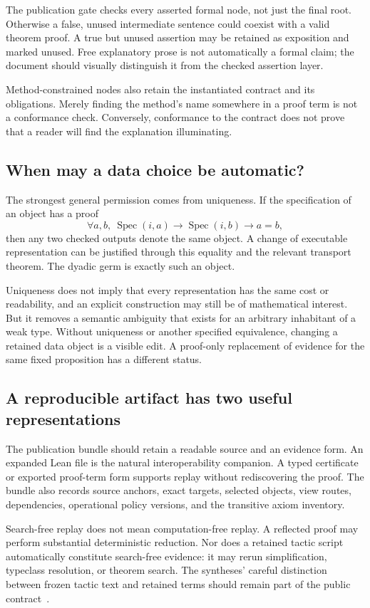 \documentclass[11pt,letterpaper]{article}
\newcommand{\Spec}{\operatorname{Spec}}
\theoremstyle{definition}
\theoremstyle{remark}
\begin{document}
The publication gate checks every asserted formal node, not just the final
root. Otherwise a false, unused intermediate sentence could coexist with a
valid theorem proof. A true but unused assertion may be retained as exposition
and marked unused. Free explanatory prose is not automatically a formal claim;
the document should visually distinguish it from the checked assertion layer.

Method-constrained nodes also retain the instantiated contract and its
obligations. Merely finding the method's name somewhere in a proof term is not
a conformance check. Conversely, conformance to the contract does not prove
that a reader will find the explanation illuminating.

\subsection{When may a data choice be automatic?}
The strongest general permission comes from uniqueness. If the specification
of an object has a proof
\[
 \forall a,b,\ \Spec(i,a)\to\Spec(i,b)\to a=b,
\]
then any two checked outputs denote the same object. A change of executable
representation can be justified through this equality and the relevant
transport theorem. The dyadic germ is exactly such an object.

Uniqueness does not imply that every representation has the same cost or
readability, and an explicit construction may still be of mathematical
interest. But it removes a semantic ambiguity that exists for an arbitrary
inhabitant of a weak type. Without uniqueness or another specified equivalence,
changing a retained data object is a visible edit. A proof-only replacement
of evidence for the same fixed proposition has a different status.

\subsection{A reproducible artifact has two useful representations}
The publication bundle should retain a readable source and an evidence form.
An expanded Lean file is the natural interoperability companion. A typed
certificate or exported proof-term form supports replay without rediscovering
the proof. The bundle also records source anchors, exact targets, selected
objects, view routes, dependencies, operational policy versions, and the
transitive axiom inventory.

Search-free replay does not mean computation-free replay. A reflected proof
may perform substantial deterministic reduction. Nor does a retained tactic
script automatically constitute search-free evidence: it may rerun
simplification, typeclass resolution, or theorem search. The syntheses' careful
distinction between frozen tactic text and retained terms should remain part
of the public contract~\cite{synthesis,blueprints}.
\end{document}
